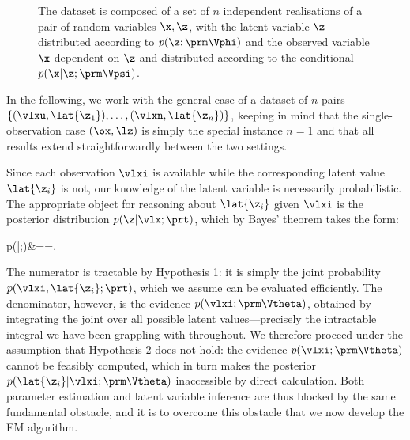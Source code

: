 \begin{figure}[ht]
\begin{center}
\caption{The dataset is composed of a set of $n$ independent realisations of a pair of
random variables $\x, \z$, with the latent variable $\z$ distributed according to
$p(\z;\prm\Vphi)$ and the observed variable $\x$ dependent on $\z$ and distributed
according to the conditional $p(\x|\z;\prm\Vpsi)$.}\label{bn2}
\end{center}
\end{figure}

In the following, we work with the general case of a dataset of $n$ pairs
$\{(\vlxu,\lat{\z_1}),\ldots,(\vlxn,\lat{\z_n})\}$, keeping in mind that the
single-observation case $(\ox,\lz)$ is simply the special instance $n=1$ and that all
results extend straightforwardly between the two settings.

Since each observation $\vlxi$ is available while the corresponding latent value
$\lat{\z_i}$ is not, our knowledge of the latent variable is necessarily probabilistic. The
appropriate object for reasoning about $\lat{\z_i}$ given $\vlxi$ is the posterior
distribution $p(\z|\vlx;\prt)$, which by Bayes' theorem takes the form:
\begin{myalign}
p(|\vlxi;\prt)&==.
\end{myalign}
The numerator is tractable by Hypothesis 1: it is simply the joint probability
$p(\vlxi,\lat{\z_i};\prt)$, which we assume can be evaluated efficiently. The denominator,
however, is the evidence $p(\vlxi;\prm\Vtheta)$, obtained by integrating the joint over all
possible latent values---precisely the intractable integral we have been grappling with
throughout. We therefore proceed under the assumption that Hypothesis 2 does not hold:
the evidence $p(\vlxi;\prm\Vtheta)$ cannot be feasibly computed, which in turn makes the
posterior $p(\lat{\z_i}|\vlxi;\prm\Vtheta)$ inaccessible by direct calculation. Both
parameter estimation and latent variable inference are thus blocked by the same
fundamental obstacle, and it is to overcome this obstacle that we now develop the EM
algorithm.

